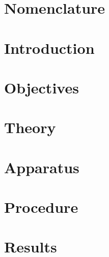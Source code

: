 \documentclass[a4paper,12pt]{article}
\begin{document}



\tableofcontents
\listoffigures
\listoftables
\clearpage


\section*{Nomenclature}

\clearpage


\section{Introduction}


\section{Objectives}


\section{Theory}


\section{Apparatus}

\section{Procedure}


\section{Results}
\end{document}
